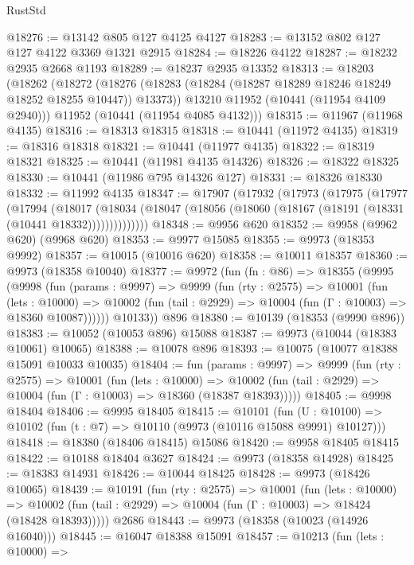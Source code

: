 \begin{lexlean}{RustStd}
\begin{coremodule}
@18276 := @13142 @805 @127 @4125 @4127
@18283 := @13152 @802 @127 @127 @4122 @3369 @1321 @2915
@18284 := @18226 @4122
@18287 := @18232 @2935 @2668 @1193
@18289 := @18237 @2935 @13352
@18313 := @18203
    (@18262
      (@18272
        (@18276 (@18283 (@18284 (@18287 @18289 @18246 @18249 @18252 @18255 @10447)) @13373))
        @13210
        @11952
        (@10441 (@11954 @4109 @2940)))
      @11952
      (@10441 (@11954 @4085 @4132)))
@18315 := @11967 (@11968 @4135)
@18316 := @18313 @18315
@18318 := @10441 (@11972 @4135)
@18319 := @18316 @18318
@18321 := @10441 (@11977 @4135)
@18322 := @18319 @18321
@18325 := @10441 (@11981 @4135 @14326)
@18326 := @18322 @18325
@18330 := @10441 (@11986 @795 @14326 @127)
@18331 := @18326 @18330
@18332 := @11992 @4135
@18347 := @17907
    (@17932
      (@17973
        (@17975
          (@17977
            (@17994
              (@18017
                (@18034 (@18047 (@18056 (@18060 (@18167 (@18191 (@18331 (@10441 @18332))))))))))))))
@18348 := @9956 @620
@18352 := @9958 (@9962 @620) (@9968 @620)
@18353 := @9977 @15085
@18355 := @9973 (@18353 @9992)
@18357 := @10015 (@10016 @620)
@18358 := @10011 @18357
@18360 := @9973 (@18358 @10040)
@18377 := @9972
    (fun (fn : @86) =>
    @18355
      (@9995
        (@9998
          (fun (params : @9997) =>
          @9999
            (fun (rty : @2575) =>
            @10001
              (fun (lets : @10000) =>
              @10002 (fun (tail : @2929) => @10004 (fun (Γ : @10003) => @18360 @10087))))))
        @10133))
    @896
@18380 := @10139 (@18353 (@9990 @896))
@18383 := @10052 (@10053 @896) @15088
@18387 := @9973 (@10044 (@18383 @10061) @10065)
@18388 := @10078 @896
@18393 := @10075 (@10077 @18388 @15091 @10033 @10035)
@18404 := fun (params : @9997) =>
  @9999
    (fun (rty : @2575) =>
    @10001
      (fun (lets : @10000) =>
      @10002 (fun (tail : @2929) => @10004 (fun (Γ : @10003) => @18360 (@18387 @18393)))))
@18405 := @9998 @18404
@18406 := @9995 @18405
@18415 := @10101
    (fun (U : @10100) => @10102 (fun (t : @7) => @10110 (@9973 (@10116 @15088 @9991) @10127)))
@18418 := @18380 (@18406 @18415) @15086
@18420 := @9958 @18405 @18415
@18422 := @10188 @18404 @3627
@18424 := @9973 (@18358 @14928)
@18425 := @18383 @14931
@18426 := @10044 @18425
@18428 := @9973 (@18426 @10065)
@18439 := @10191
    (fun (rty : @2575) =>
    @10001
      (fun (lets : @10000) =>
      @10002 (fun (tail : @2929) => @10004 (fun (Γ : @10003) => @18424 (@18428 @18393)))))
    @2686
@18443 := @9973 (@18358 (@10023 (@14926 @16040)))
@18445 := @16047 @18388 @15091
@18457 := @10213
    (fun (lets : @10000) =>

\end{coremodule}
\end{lexlean}
